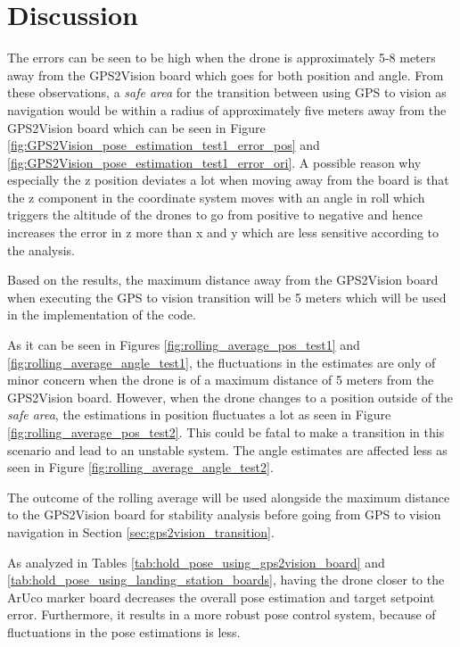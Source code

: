 \documentclass[../Head/report.tex]{subfiles}
\begin{document}
\section{Discussion}

The errors can be seen to be high when the drone is approximately 5-8 meters away from the GPS2Vision board which goes for both position and angle. From these observations, a \textit{safe area} for the transition between using GPS to vision as navigation would be within a radius of approximately five meters away from the GPS2Vision board which can be seen in Figure \ref{fig:GPS2Vision_pose_estimation_test1_error_pos} and \ref{fig:GPS2Vision_pose_estimation_test1_error_ori}. A possible reason why especially the z position deviates a lot when moving away from the board is that the z component in the coordinate system moves with an angle in roll which triggers the altitude of the drones to go from positive to negative and hence increases the error in z more than x and y which are less sensitive according to the analysis. 

Based on the results, the maximum distance away from the GPS2Vision board when executing the GPS to vision transition will be 5 meters which will be used in the implementation of the code.

As it can be seen in Figures \ref{fig:rolling_average_pos_test1} and \ref{fig:rolling_average_angle_test1}, the fluctuations in the estimates are only of minor concern when the drone is of a maximum distance of 5 meters from the GPS2Vision board. However, when the drone changes to a position outside of the \textit{safe area}, the estimations in position fluctuates a lot as seen in Figure \ref{fig:rolling_average_pos_test2}. This could be fatal to make a transition in this scenario and lead to an unstable system. The angle estimates are affected less as seen in Figure \ref{fig:rolling_average_angle_test2}.

The outcome of the rolling average will be used alongside the maximum distance to the GPS2Vision board for stability analysis before going from GPS to vision navigation in Section \ref{sec:gps2vision_transition}.


As analyzed in Tables \ref{tab:hold_pose_using_gps2vision_board} and \ref{tab:hold_pose_using_landing_station_boards}, having the drone closer to the ArUco marker board decreases the overall pose estimation and target setpoint error. Furthermore, it results in a more robust pose control system, because of fluctuations in the pose estimations is less. 
\end{document}
